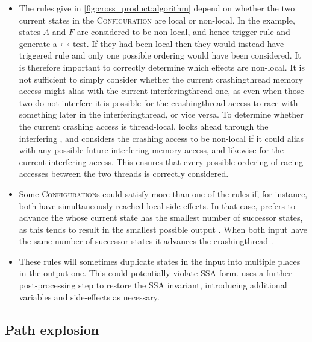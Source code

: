 {\begin{itemize}
\item {} The rules give
  in \autoref{fig:cross_product:algorithm} depend on whether the two
  current states in the \textsc{Configuration} are local or non-local.
  In the example, states $A$ and $F$ are considered to be non-local,
  and hence trigger rule  and generate a
  $\leftarrowtail$ test.  If they had been local then they would
  instead have triggered rule  and only one possible
  ordering would have been considered.  It is therefore important to
  correctly determine which effects are non-local.  It is not
  sufficient to simply consider whether the current
  \gls{crashingthread} memory access might alias with the current
  \gls{interferingthread} one, as even when those two do not interfere
  it is possible for the \gls{crashingthread} access to race with
  something later in the \gls{interferingthread}, or vice versa.  To
  determine whether the current crashing access is thread-local,
  {\technique} looks ahead through the interfering {\StateMachine},
  and considers the crashing access to be non-local if it could alias
  with any possible future interfering memory access, and likewise for
  the current interfering access.  This ensures that every possible
  ordering of racing accesses between the two threads is correctly
  considered.

\item 
  Some \textsc{Configuration}s could satisfy more than one of the rules if, for
  instance, both {\StateMachines} have simultaneously reached local
  side-effects.  In that case, {\technique} prefers to advance the
  {\StateMachine} whose current state has the smallest number of
  successor states, as this tends to result in the smallest possible
  output {\StateMachine}.  When both input {\StateMachines} have the
  same number of successor states it advances the \gls{crashingthread}
  {\StateMachine}.

\item These rules will sometimes duplicate states in the input
  {\StateMachines} into multiple places in the output one.  This could
  potentially violate SSA form.  {\Technique} uses a further
  post-processing step to restore the SSA invariant, introducing
  additional variables and \state{$\Phi$} side-effects as necessary.
\end{itemize}

\subsection{Path explosion}

}
